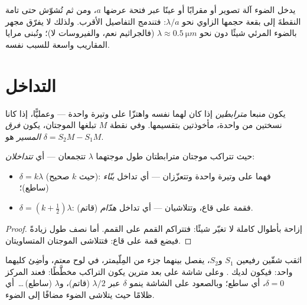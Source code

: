 \begin{remark}\label{rem:g12:light-as-wave:limits}
يدخل الضوء آلة تصوير أو مقرابًا أو عينًا عبر فتحة
عرضها $a$، ومن ثم تُشوّش حتى  تامة النقطةَ إلى بقعة
حجمها الزاوي نحو $\lambda/a$: فتندمج التفاصيل الأقرب. ولذلك لا يفرّق
مجهر بالضوء المرئي شيئًا دون نحو $\lambda \approx
\qty{0.5}{\micro m}$ (فالجراثيم نعم، والفيروسات لا)؛ وتُبنى مرايا
المقاريب واسعة للسبب نفسه.
\end{remark}

\section{التداخل}

\begin{definition}\label{def:g12:light-as-wave:coherent}
يكون منبعا  \emph{مترابطين} إذا
كان لهما  نفسه واهتزّا على وتيرة واحدة --- وعمليًّا،
إذا كانا نسختين من  واحدة، مأخوذتين بتقسيمها. وفي نقطة
$M$ تبلغها الموجتان، يكون \emph{فرق المسير}%
 هو $\delta = S_2M - S_1M$.
\end{definition}

\begin{proposition}\label{prop:g12:light-as-wave:conditions}
حيث تتراكب موجتان مترابطتان طول موجتهما $\lambda$ تتجمعان ---
أي \emph{تتداخلان}:
\begin{itemize}
  \item $\delta = k\lambda$ (حيث $k$ صحيح): فهما على وتيرة واحدة وتتعزّزان ---
        أي تداخل \emph{بنّاء} (ساطع)؛
  \item $\delta = (k + \tfrac12)\lambda$: فقمة على قاع، وتتلاشيان
        --- أي تداخل \emph{هدّام} (قاتم).
\end{itemize}
\end{proposition}

\begin{proof}
إزاحة  بأطوال  كاملة لا تغيّر شيئًا: فتتراكم القمم
على القمم. أما نصف طول  زيادةً فيضع قمة على قاع: فتتلاشى
الموجتان المتساويتان.
\end{proof}

\begin{example}\label{ex:g12:light-as-wave:young}
اثقب شقّين رفيعين $S_1$ و$S_2$، يفصل بينهما جزء من المِلّيمتر،
في لوح معتم، وأضِئ كليهما  واحد: فيكون لديك . وعلى شاشة على بعد مترين يكون التراكب مخطَّطًا:
فعند المركز $\delta = 0$، أي ساطع؛ وبالصعود على الشاشة ينمو $\delta$
عبر $\lambda/2$ (قاتم)، و$\lambda$ (ساطع)\,\dots\ أي ظلامًا
حيث يتلاشى الضوء مضافًا إلى الضوء.
\end{example}

